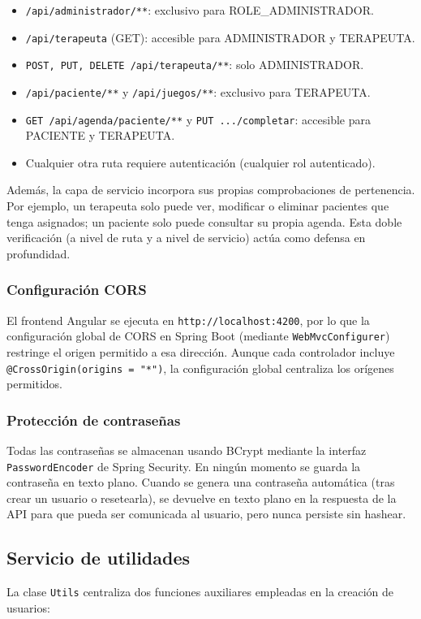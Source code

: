 \begin{itemize}
    \item \texttt{/api/administrador/**}: exclusivo para ROLE\_ADMINISTRADOR.
    \item \texttt{/api/terapeuta} (GET): accesible para ADMINISTRADOR y TERAPEUTA.
    \item \texttt{POST, PUT, DELETE /api/terapeuta/**}: solo ADMINISTRADOR.
    \item \texttt{/api/paciente/**} y \texttt{/api/juegos/**}: exclusivo para TERAPEUTA.
    \item \texttt{GET /api/agenda/paciente/**} y \texttt{PUT .../completar}: accesible para PACIENTE y TERAPEUTA.
    \item Cualquier otra ruta requiere autenticación (cualquier rol autenticado).
\end{itemize}

Además, la capa de servicio incorpora sus propias comprobaciones de pertenencia. Por ejemplo, un terapeuta solo puede ver, modificar o eliminar pacientes que tenga asignados; un paciente solo puede consultar su propia agenda. Esta doble verificación (a nivel de ruta y a nivel de servicio) actúa como defensa en profundidad.

\subsubsection{Configuración CORS}
El frontend Angular se ejecuta en \texttt{http://localhost:4200}, por lo que la configuración global de CORS en Spring Boot (mediante \texttt{WebMvcConfigurer}) restringe el origen permitido a esa dirección. Aunque cada controlador incluye \texttt{@CrossOrigin(origins = "*")}, la configuración global centraliza los orígenes permitidos.

\subsubsection{Protección de contraseñas}
Todas las contraseñas se almacenan usando BCrypt mediante la interfaz \texttt{PasswordEncoder} de Spring Security. En ningún momento se guarda la contraseña en texto plano. Cuando se genera una contraseña automática (tras crear un usuario o resetearla), se devuelve en texto plano en la respuesta de la API para que pueda ser comunicada al usuario, pero nunca persiste sin hashear.

\subsection{Servicio de utilidades}
La clase \texttt{Utils} centraliza dos funciones auxiliares empleadas en la creación de usuarios:

